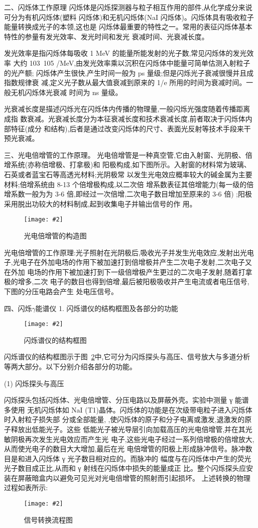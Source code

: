 \documentclass[11pt,a4paper]{ctexart}
\newcommand{\cpic}[2]{
\begin{center}
\texttt{[image: \#2]}
\end{center}
}
\newcommand{\cpicn}[3]
{
\begin{figure}[H]
\cpic{#1}{#2}
\caption{\color{red}#3\label{#2}}
\end{figure}
}
\begin{document}
二、闪烁体工作原理
闪烁体是闪烁探测器与粒子相互作用的部件,从化学成分来说可分为有机闪烁体(塑料
闪烁体)和无机闪烁体(NaI 闪烁体)。闪烁体具有吸收粒子能量转换成光子的本领,这也是
闪烁体最重要的特性之一。常用的表征闪烁体基本特性的参量有发光效率、发光时间和发光
衰减时间、光衰减长度。

发光效率是指闪烁体每吸收 1 MeV 的能量所能发射的光子数,常见闪烁体的发光效率
大约 103~105 /MeV,由发光效率乘以沉积在闪烁体中能量可简单估测入射粒子的光产额;
闪烁体产生很快,产生时间一般为 ps 量级;但是闪烁光子衰减很慢并且成指数规律衰
减,定义光子数从最大值衰减到原来的 1/e 所用的时间为衰减时间。一般无机闪烁体光衰减
时间为 ns 量级。

光衰减长度是描述闪烁光在闪烁体内传播的物理量,一般闪烁光强度随着传播距离成指
数衰减。光衰减长度分为本征衰减长度和技术衰减长度,前者取决于闪烁体内部特征(成分
和结构),后者是通过改变闪烁体的尺寸、表面光反射等技术手段来干预光衰减。

三、光电倍增管的工作原理。
光电倍增管是一种真空管,它由入射窗、光阴极、倍增系统(亦称倍增极、打拿极)和
阳极构成,如下图所示。入射窗的材料常为玻璃、石英或者蓝宝石等高透光材料;光阴极常
以发生光电效应概率较大的碱金属为主要材料;倍增系统由 8-13 个倍增极构成,以二次倍
增系数表征其倍增能力(每一级的倍增系数一般为为 3-6 倍,即经过一次倍增,二次电子数目增加至原来的 3-6 倍)
;阳极采用脱出功较大的材料制成,起到收集电子并输出信号的作
用。
\cpicn{0.4}{t4}{光电倍增管的构造图}
光电倍增管的工作原理:光子照射在光阴极后,吸收光子并发生光电效应,发射出光电
子,光电子在外加电场的作用下被加速打到倍增极并产生二次电子发射,二次电子又在外加
电场的作用下被加速打到下一级倍增极产生更过的二次电子发射,随着打拿极的增多,二次
电子的数目也得到倍增,最后被阳极吸收并产生电流或者电压信号,下图的分压电路会产生
处电压信号。



四、闪烁$\gamma$能谱仪
1. 闪烁谱仪的结构框图及各部分的功能
\cpicn{0.4}{t5}{闪烁谱仪的结构框图}
闪烁谱仪的结构框图示于图~\ref{t5}中,它可分为闪烁探头与高压、信号放大与多道分析
等两大部分。以下分别介绍各部分的功能。

(1) 闪烁探头与高压

闪烁探头包括闪烁体、光电倍增管、分压电路以及屏蔽外壳。实验中测量 γ 能谱多使用
无机闪烁体如 NaI (T1)晶体。闪烁体的功能是在次级带电粒子进入闪烁体时入射粒子损失部
分或全部能量,
,使闪烁体的原子和分子电离或激发,退激发的原子释放出低能光子。这些
低能光子被光导层引向加载高压的光电倍增管,并在其光敏阴极再次发生光电效应而产生光
电子,这些光电子经过一系列倍增极的倍增放大,从而使光电子的数目大大增加,最后在光
电倍增管的阳极上形成脉冲信号。脉冲数目是和进入闪烁体 γ 光子数目相对应的。而脉冲的
幅度与在闪烁体中产生的荧光光子数目成正比,从而和 γ 射线在闪烁体中损失的能量成正
比。整个闪烁探头应安装在屏蔽暗盒内以避免可见光对光电倍增管的照射而引起损坏。
上述转换的物理过程如表所示:
\cpicn{0.6}{t6}{信号转换流程图}
\end{document}
